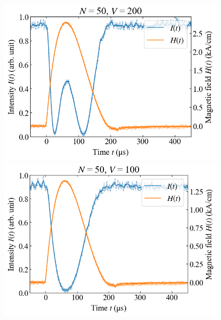 \documentclass[9pt,dvipdfmx,a4paper]{jsarticle}
\begin{document}
\begin{figure}[H]
\begin{minipage}[t]{0.24\columnwidth}
        \includegraphics[width = \columnwidth]{xt/15.png}
    \end{minipage}
    \hfill
    \begin{minipage}[t]{0.24\columnwidth}
        \centering
        \includegraphics[width = \columnwidth]{xt/16.png}
    \end{minipage}
\end{figure}
\end{document}

